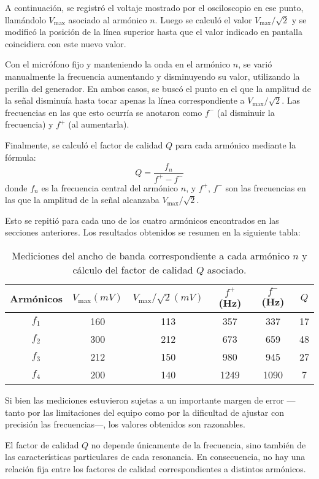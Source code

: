\documentclass[12pt, a4paper]{article}
\begin{document}
A continuación, se registró el voltaje mostrado por el osciloscopio en ese punto, llamándolo $V_\mathrm{max}$ asociado al armónico $n$. Luego se calculó el valor $V_\mathrm{max}/\sqrt{2}$ y se modificó la posición de la línea superior hasta que el valor indicado en pantalla coincidiera con este nuevo valor.

Con el micrófono fijo y manteniendo la onda en el armónico $n$, se varió manualmente la frecuencia aumentando y disminuyendo su valor, utilizando la perilla del generador. En ambos casos, se buscó el punto en el que la amplitud de la señal disminuía hasta tocar apenas la línea correspondiente a $V_\mathrm{max}/\sqrt{2}$. Las frecuencias en las que esto ocurría se anotaron como $f^-$ (al disminuir la frecuencia) y $f^+$ (al aumentarla).

Finalmente, se calculó el factor de calidad $Q$ para cada armónico mediante la fórmula:
$$Q = \frac{f_n}{f^+ - f^-}$$
donde $f_n$ es la frecuencia central del armónico $n$, y $f^+$, $f^-$ son las frecuencias en las que la amplitud de la señal alcanzaba $V_\mathrm{max}/\sqrt{2}$.

Esto se repitió para cada uno de los cuatro armónicos encontrados en las secciones anteriores. Los resultados obtenidos se resumen en la siguiente tabla:

\begin{table}[H]
    \centering
    \begin{tabular}{|c|c|c|c|c|c|}
    \hline
    \multirow{1}{2.1cm}{\centering Armónicos} 
        & $V_\mathrm{max} (mV)$
        & $V_\mathrm{max}/\sqrt{2} (mV)$ 
        & $f^+$ (Hz) 
        & $f^-$ (Hz)
        & $Q$ \\
    \hline
    $f_1$  & 160 & 113 & 357 & 337 & 17\\ \hline
    $f_2$  & 300 & 212 & 673 & 659 & 48\\ \hline
    $f_3$  & 212  & 150 & 980 & 945 & 27\\ \hline
    $f_4$  & 200  & 140 & 1249 & 1090 & 7\\ \hline
    \end{tabular}
    \caption{\centering Mediciones del ancho de banda correspondiente a cada armónico $n$ y cálculo del factor de calidad $Q$ asociado.}
    \label{tabla3}
\end{table}

Si bien las mediciones estuvieron sujetas a un importante margen de error —tanto por las limitaciones del equipo como por la dificultad de ajustar con precisión las frecuencias—, los valores obtenidos son razonables. 

El factor de calidad $Q$ no depende únicamente de la frecuencia, sino también de las características particulares de cada resonancia. En consecuencia, no hay una relación fija entre los factores de calidad correspondientes a distintos armónicos.
\end{document}
